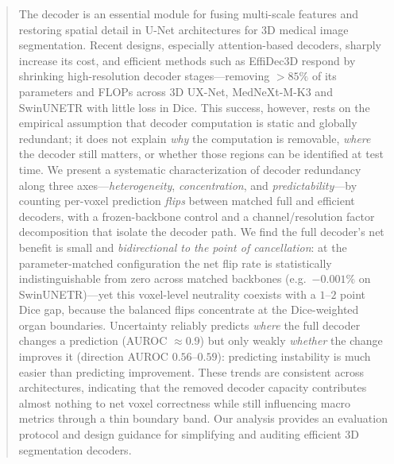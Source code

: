 \begin{abstract}
The decoder is an essential module for fusing multi-scale features and restoring spatial
detail in U-Net architectures for 3D medical image segmentation. Recent designs, especially attention-based 
decoders, sharply increase its cost, and efficient methods such as EffiDec3D respond by shrinking high-resolution 
decoder stages---removing $>85\%$ of its parameters and
FLOPs across 3D UX-Net, MedNeXt-M-K3 and SwinUNETR with little loss in Dice.
This success, however, rests on the empirical assumption that decoder computation is
static and globally redundant; it does not explain \emph{why} the computation is
removable, \emph{where} the decoder still matters, or whether those regions can be
identified at test time. We present a systematic characterization of decoder
redundancy along three axes---\emph{heterogeneity}, \emph{concentration}, and
\emph{predictability}---by counting per-voxel prediction \emph{flips} between matched
full and efficient decoders, with a frozen-backbone control and a channel/resolution
factor decomposition that isolate the decoder path. We find the full decoder's net
benefit is small and \emph{bidirectional to the point of cancellation}: at the
parameter-matched configuration the net flip rate is statistically indistinguishable
from zero across matched backbones (e.g.\ $-0.001\%$ on SwinUNETR)---yet this voxel-level
neutrality coexists with a $1$--$2$ point Dice gap, because the balanced flips concentrate
at the Dice-weighted organ boundaries. Uncertainty reliably predicts \emph{where} the full
decoder changes a prediction (AUROC $\approx\!0.9$) but only weakly \emph{whether} the
change improves it (direction AUROC $0.56$--$0.59$): predicting instability is much
easier than predicting improvement. These trends are
consistent across architectures, indicating that the removed decoder capacity contributes
almost nothing to net voxel correctness while still influencing macro metrics through a
thin boundary band.
Our analysis provides an evaluation protocol and design guidance for simplifying and
auditing efficient 3D segmentation decoders.
\end{abstract}
